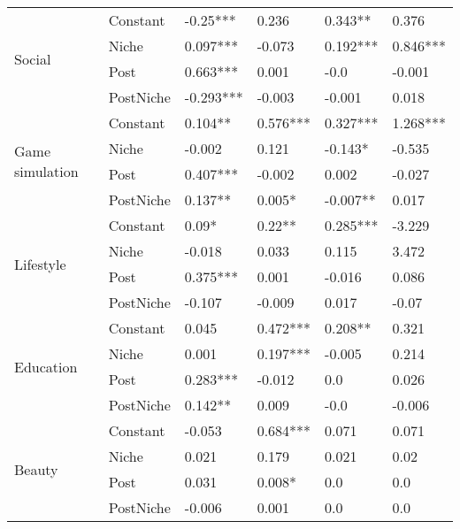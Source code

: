 \begin{longtable}[h!]{llllll}
\cline{1-6}
\multirow{4}{*}{Social} & Constant &            -0.25*** &       0.236 &    0.343** &      0.376 \\
          & Niche &            0.097*** &      -0.073 &   0.192*** &   0.846*** \\
          & Post &            0.663*** &       0.001 &       -0.0 &     -0.001 \\
          & PostNiche &           -0.293*** &      -0.003 &     -0.001 &      0.018 \\
\cline{1-6}
\multirow{4}{*}{Game simulation} & Constant &             0.104** &    0.576*** &   0.327*** &   1.268*** \\
          & Niche &              -0.002 &       0.121 &    -0.143* &     -0.535 \\
          & Post &            0.407*** &      -0.002 &      0.002 &     -0.027 \\
          & PostNiche &             0.137** &      0.005* &   -0.007** &      0.017 \\
\cline{1-6}
\multirow{4}{*}{Lifestyle} & Constant &               0.09* &      0.22** &   0.285*** &     -3.229 \\
          & Niche &              -0.018 &       0.033 &      0.115 &      3.472 \\
          & Post &            0.375*** &       0.001 &     -0.016 &      0.086 \\
          & PostNiche &              -0.107 &      -0.009 &      0.017 &      -0.07 \\
\cline{1-6}
\multirow{4}{*}{Education} & Constant &               0.045 &    0.472*** &    0.208** &      0.321 \\
          & Niche &               0.001 &    0.197*** &     -0.005 &      0.214 \\
          & Post &            0.283*** &      -0.012 &        0.0 &      0.026 \\
          & PostNiche &             0.142** &       0.009 &       -0.0 &     -0.006 \\
\cline{1-6}
\multirow{4}{*}{Beauty} & Constant &              -0.053 &    0.684*** &      0.071 &      0.071 \\
          & Niche &               0.021 &       0.179 &      0.021 &       0.02 \\
          & Post &               0.031 &      0.008* &        0.0 &        0.0 \\
          & PostNiche &              -0.006 &       0.001 &        0.0 &        0.0 \\

\end{longtable}
